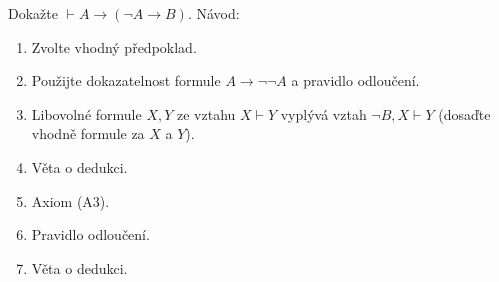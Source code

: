 Dokažte $\vdash A \rightarrow (\neg A \rightarrow B)$.
Návod:
\begin{enumerate}[1)]
	\item Zvolte vhodný předpoklad.
	\item Použijte dokazatelnost formule $A \rightarrow \neg\neg A$ a pravidlo odloučení.
	\item Libovolné formule $X,Y$ ze vztahu $X \vdash Y$ vyplývá vztah $\neg B, X \vdash Y$ (dosaďte vhodně formule za $X$ a $Y$).
	\item Věta o dedukci.
	\item Axiom (A3).
	\item Pravidlo odloučení.
	\item Věta o dedukci.
\end{enumerate}
